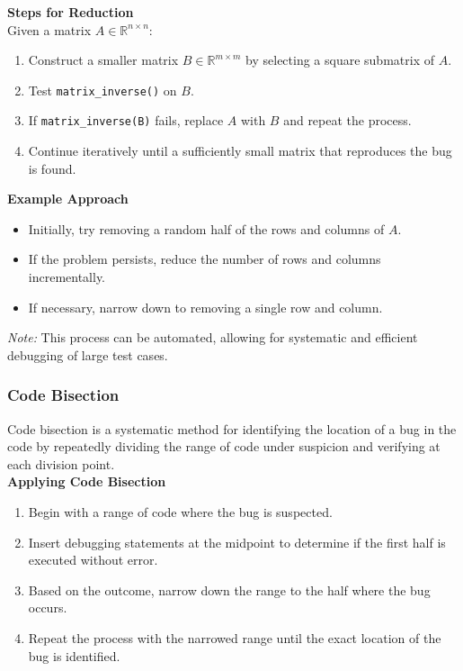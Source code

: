\documentclass[12pt]{article}
\begin{document}
\textbf{Steps for Reduction}\\
Given a matrix \( A \in \mathbb{R}^{n \times n} \):
\begin{enumerate}
    \item Construct a smaller matrix \( B \in \mathbb{R}^{m \times m} \) by selecting a square submatrix of \( A \).
    \item Test \texttt{matrix\_inverse()} on \( B \).
    \item If \texttt{matrix\_inverse(B)} fails, replace \( A \) with \( B \) and repeat the process.
    \item Continue iteratively until a sufficiently small matrix that reproduces the bug is found.
\end{enumerate}

\textbf{Example Approach}
\begin{itemize}
    \item Initially, try removing a random half of the rows and columns of \( A \).
    \item If the problem persists, reduce the number of rows and columns incrementally.
    \item If necessary, narrow down to removing a single row and column.
\end{itemize}

\textit{Note:} This process can be automated, allowing for systematic and efficient debugging of large test cases.



\subsubsection{Code Bisection}

Code bisection is a systematic method for identifying the location of a bug in the code by repeatedly dividing the range of code under suspicion and verifying at each division point.\\

\textbf{Applying Code Bisection}
\begin{enumerate}
    \item Begin with a range of code where the bug is suspected.
    \item Insert debugging statements at the midpoint to determine if the first half is executed without error.
    \item Based on the outcome, narrow down the range to the half where the bug occurs.
    \item Repeat the process with the narrowed range until the exact location of the bug is identified.
\end{enumerate}
\end{document}
